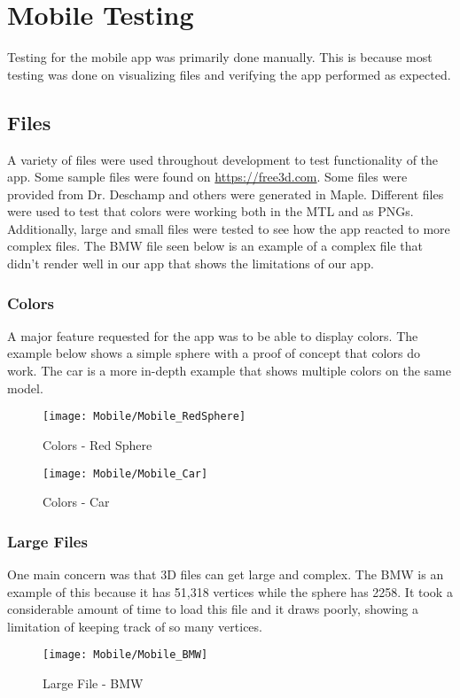 
\section{Mobile Testing}
    Testing for the mobile app was primarily done manually. This is because most testing was done on visualizing files and verifying the app performed as expected.
    \subsection{Files}
        A variety of files were used throughout development to test functionality of the app. Some sample files were found on \url{https://free3d.com}. Some files were provided from Dr. Deschamp and others were generated in Maple. Different files were used to test that colors were working both in the MTL and as PNGs. Additionally, large and small files were tested to see how the app reacted to more complex files. The BMW file seen below is an example of a complex file that didn't render well in our app that shows the limitations of our app.
        \subsubsection{Colors}
        A major feature requested for the app was to be able to display colors. The example below shows a simple sphere with a proof of concept that colors do work. The car is a more in-depth example that shows multiple colors on the same model.
        \begin{figure}[H]
            \texttt{[image: Mobile/Mobile\_RedSphere]}
            \centering
            \caption{Colors - Red Sphere}
            \label{fig:mobileRedSphere}
        \end{figure}

        \begin{figure}[H]
            \texttt{[image: Mobile/Mobile\_Car]}
            \centering
            \caption{Colors - Car}
            \label{fig:mobileCar}
        \end{figure}
        
        \subsubsection{Large Files}
        One main concern was that 3D files can get large and complex. The BMW is an example of this because it has 51,318 vertices while the sphere has 2258. It took a considerable amount of time to load this file and it draws poorly, showing a limitation of keeping track of so many vertices.
            \begin{figure}[H]
                \texttt{[image: Mobile/Mobile\_BMW]}
                \centering
                \caption{Large File - BMW}
                \label{fig:mobileBMW}
            \end{figure}
    
